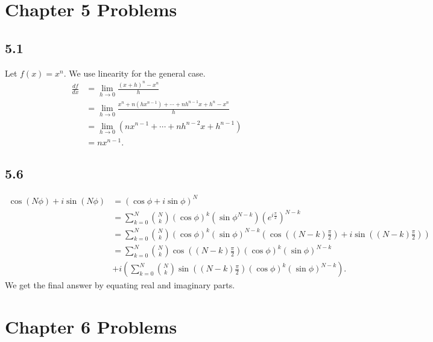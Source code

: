 \documentclass[10pt]{mypackage}
\begin{document}
\section{Chapter 5 Problems}%
\subsection{5.1}%
Let $f(x) = x^n$. We use linearity for the general case.
\begin{align*}
  \frac{df}{dx} &= \lim_{h\rightarrow 0}\frac{\left(x + h\right)^n - x^n}{h}\\
                &= \lim_{h\rightarrow 0}\frac{x^n + n\left(hx^{n-1}\right) + \cdots + nh^{n-1}x + h^{n} - x^n }{h}\\
                &= \lim_{h\rightarrow 0}\left(nx^{n-1} + \cdots + nh^{n-2}x + h^{n-1}\right)\\
                &= nx^{n-1}.
\end{align*}
\subsection{5.6}%
\begin{align*}
  \cos\left(N\phi\right) + i\sin\left(N\phi\right) &= \left(\cos \phi + i\sin\phi\right)^N\\
                                                   &= \sum_{k=0}^{N}{N\choose k}\left(\cos\phi\right)^{k}\left(\sin\phi^{N-k}\right)\left(e^{i\frac{\pi}{2}}\right)^{N-k}\\
                                                   &= \sum_{k=0}^{N}{N\choose k}\left(\cos\phi\right)^k\left(\sin\phi\right)^{N-k}\left(\cos\left(\left(N-k\right)\frac{\pi}{2}\right) + i\sin\left(\left(N-k\right)\frac{\pi}{2}\right)\right)\\
                                                   &= \sum_{k=0}^{N}{N\choose k}\cos\left(\left(N-k\right)\frac{\pi}{2}\right)\left(\cos\phi\right)^k\left(\sin\phi\right)^{N-k} \\
                                                   & +i\left(\sum_{k=0}^{N}{N\choose k}\sin\left(\left(N-k\right)\frac{\pi}{2}\right)\left(\cos\phi\right)^k\left(\sin\phi\right)^{N-k}\right).
\end{align*}
We get the final answer by equating real and imaginary parts.
\section{Chapter 6 Problems}%
\end{document}
